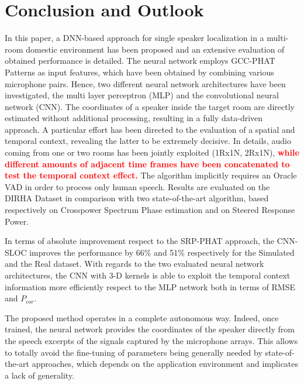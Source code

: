 \documentclass[review]{elsarticle}
\begin{document}
\section{Conclusion and Outlook}
\label{sec:concl}

In this paper, a DNN-based approach for single speaker localization in a multi-room domestic environment has been proposed and an extensive evaluation of obtained performance is detailed. The neural network employs GCC-PHAT Patterns as input features, which have been obtained by combining various microphone pairs. Hence, two different neural network architectures have been investigated, the multi layer perceptron (MLP) and the convolutional neural network (CNN). The coordinates of a speaker inside the target room are directly estimated without additional processing, resulting in a fully data-driven approach.
A particular effort has been directed to the evaluation of a spatial and temporal context, revealing the latter to be extremely decisive. In details, audio coming from one or two rooms has been jointly exploited (1Rx1N, 2Rx1N),
\textcolor{red}{\textbf{while different amounts of adjacent time frames have been concatenated to test the temporal context effect.}}
The algorithm implicitly requires an Oracle VAD in order to process only human speech. Results are evaluated on the DIRHA Dataset in comparison with two state-of-the-art algorithm, based respectively on Crosspower Spectrum Phase estimation and on Steered Response Power.

In terms of absolute improvement respect to the SRP-PHAT approach, the CNN-SLOC improves the performance by 66\% and 51\% respectively for the Simulated and the Real dataset. With regards to the two evaluated neural network architectures, the CNN with 3-D kernels is able to exploit the temporal context information more efficiently respect to the MLP network both in terms of RMSE and $P_{cor}$.


The proposed method operates in a complete autonomous way.
Indeed, once trained, the neural network provides the coordinates of the speaker directly from the speech excerpts of the signals captured by the microphone arrays. This allows to totally avoid the fine-tuning of parameters being generally needed by state-of-the-art approaches, which depends on the application environment and implicates a lack of generality.
\end{document}

